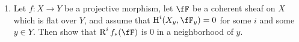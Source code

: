 \documentclass[a4paper]{article}
\begin{document}
\begin{enumerate} [label=\textbf{\arabic*.}, leftmargin=0em]

    \item[\textbf{8.}] Let $f : X \to Y$ be a projective morphism, let $\fF$ be a coherent sheaf on $X$ which is flat over $Y$, and assume that $\cH^i(X_y, \fF_y) = 0$ for some $i$ and some $y \in Y$. Then show that $\dR^if_*(\fF)$ is $0$ in a neighborhood of $y$.


\end{enumerate}
\end{document}
